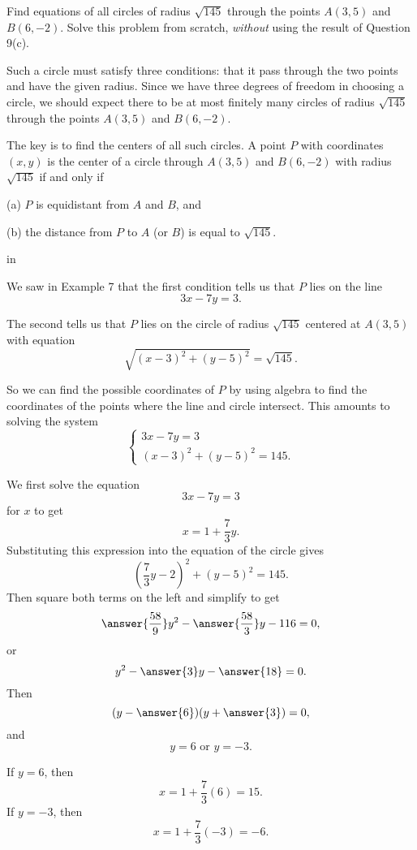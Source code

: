 \documentclass{ximera}
\newcommand{\pskip}{\vskip 0.1 in}
\begin{document}
\begin{example}  \label{Ex6}
Find equations of all circles of radius $\sqrt{145}$ through the points $A(3,5)$ and $B(6,-2)$. Solve this problem from scratch, \emph{without} using the result of Question 9(c).


\begin{explanation}
Such a circle must satisfy three conditions: that it pass through the two points and have the given radius. Since we have three degrees of freedom in choosing a circle, we should expect there to be at most finitely many circles of radius $\sqrt{145}$ through the points $A(3,5)$ and $B(6,-2)$.

The key is to find the centers of all such circles. A point $P$ with coordinates $(x,y)$ is the center of a circle through $A(3,5)$ and $B(6,-2)$ with radius $\sqrt{145}$  if and only if 

(a) $P$ is equidistant from $A$ and $B$, and

(b) the distance from $P$ to $A$ (or $B$) is equal to $\sqrt{145}$.

\pskip

We saw in Example 7 that the first condition tells us that $P$ lies on the line
\[
        3x - 7y  = 3.
\] 

The second tells us that $P$ lies on the circle of radius $\sqrt{145}$ centered at $A(3,5)$ with equation 
\[
    \sqrt{(x-3)^2 + (y-5)^2} = \sqrt{145} .
\]

So we can find the possible coordinates of $P$ by using algebra to find the coordinates of the points where the line and circle intersect. This amounts to solving the system
\[
   \begin{cases}
      3x - 7y  = 3 \\
      (x-3)^2 + (y-5)^2 = 145 .  
   \end{cases}
\]

We first solve the equation
\[
    3x - 7y = 3
\]
for $x$ to get
\[ 
        x = 1 + \frac{7}{3}y .
\]
Substituting this expression into the equation of the circle gives
\[
   \left( \frac{7}{3}y - 2 \right)^2 + (y-5)^2 = 145.
\]
Then square both terms on the left and simplify to get
\[
    \answer{\frac{58}{9}}y^2 - \answer{\frac{58}{3}}y - 116 = 0 ,
\]
or
\[
       y^2 - \answer{3}y - \answer{18} = 0 . 
\]
Then 
\[
    (y-\answer{6})(y+\answer{3}) = 0 ,
\]
and 
\[
   y = 6 \text{ or } y= -3 .
\]

If $y=6$, then
\[
  x =  1 + \frac{7}{3}(6) = 15 .
\]
If $y=-3$, then
\[
    x =  1 + \frac{7}{3}(-3) = -6.
\]



\end{explanation}
\end{example}
\end{document}

